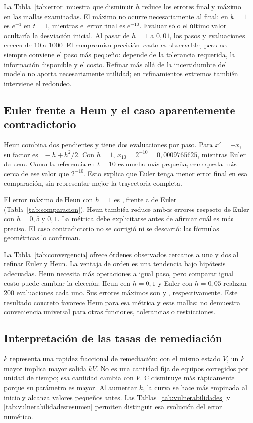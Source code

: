 \documentclass[11pt,a4paper]{article}
\begin{document}
La Tabla~\ref{tab:error} muestra que disminuir $h$ reduce los errores final y máximo en las mallas examinadas. El máximo no ocurre necesariamente al final: en $h=1$ es $e^{-1}$ en $t=1$, mientras el error final es $e^{-10}$. Evaluar sólo el último valor ocultaría la desviación inicial. Al pasar de $h=1$ a $0,01$, los pasos y evaluaciones crecen de 10 a 1000. El compromiso precisión--costo es observable, pero no siempre conviene el paso más pequeño: depende de la tolerancia requerida, la información disponible y el costo. Refinar más allá de la incertidumbre del modelo no aporta necesariamente utilidad; en refinamientos extremos también interviene el redondeo.

\subsection{Euler frente a Heun y el caso aparentemente contradictorio}
Heun combina dos pendientes y tiene dos evaluaciones por paso. Para $x'=-x$, su factor es $1-h+h^2/2$. Con $h=1$, $x_{10}=2^{-10}=0,0009765625$, mientras Euler da cero. Como la referencia en $t=10$ es mucho más pequeña, cero queda más cerca de ese valor que $2^{-10}$. Esto explica que Euler tenga menor error final en esa comparación, sin representar mejor la trayectoria completa.

El error máximo de Heun con $h=1$ es \ErrorHeunUno{}, frente a \ErrorEulerUno{} de Euler (Tabla~\ref{tab:comparacion}). Heun también reduce ambos errores respecto de Euler con $h=0,5$ y $0,1$. La métrica debe explicitarse antes de afirmar cuál es más preciso. El caso contradictorio no se corrigió ni se descartó: las fórmulas geométricas lo confirman.

La Tabla~\ref{tab:convergencia} ofrece órdenes observados cercanos a uno y dos al refinar Euler y Heun. La ventaja de orden es una tendencia bajo hipótesis adecuadas. Heun necesita más operaciones a igual paso, pero comparar igual costo puede cambiar la elección: Heun con $h=0,1$ y Euler con $h=0,05$ realizan 200 evaluaciones cada uno. Sus errores máximos son \ErrorHeunDecima{} y \ErrorEulerMediaDecima{}, respectivamente. Este resultado concreto favorece Heun para esa métrica y esas mallas; no demuestra conveniencia universal para otras funciones, tolerancias o restricciones.

\subsection{Interpretación de las tasas de remediación}
$k$ representa una rapidez fraccional de remediación: con el mismo estado $V$, un $k$ mayor implica mayor salida $kV$. No es una cantidad fija de equipos corregidos por unidad de tiempo; esa cantidad cambia con $V$. C disminuye más rápidamente porque su parámetro es mayor. Al aumentar $k$, la curva se hace más empinada al inicio y alcanza valores pequeños antes. Las Tablas~\ref{tab:vulnerabilidades} y \ref{tab:vulnerabilidadesresumen} permiten distinguir esa evolución del error numérico.
\end{document}
